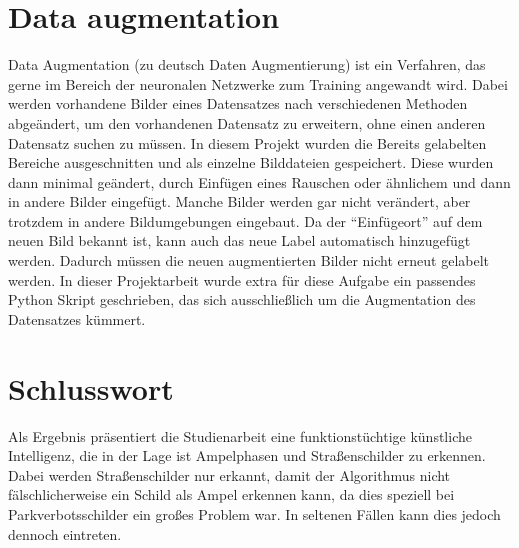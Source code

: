 \documentclass[a4paper,oneside,12pt]{report}
\begin{document}
	\chapter{Data augmentation}
	\begin{onehalfspace}
		Data Augmentation (zu deutsch Daten Augmentierung) ist ein Verfahren, das gerne im Bereich der neuronalen Netzwerke zum Training angewandt wird. Dabei werden vorhandene Bilder eines Datensatzes nach verschiedenen Methoden abgeändert, um den vorhandenen Datensatz zu erweitern, ohne einen anderen Datensatz suchen zu müssen. In diesem Projekt wurden die Bereits gelabelten Bereiche ausgeschnitten und als einzelne Bilddateien gespeichert. Diese wurden dann minimal geändert, durch Einfügen eines Rauschen oder ähnlichem und dann in andere Bilder eingefügt. Manche Bilder werden gar nicht verändert, aber trotzdem in andere Bildumgebungen eingebaut. Da der "`Einfügeort"' auf dem neuen Bild bekannt ist, kann auch das neue Label automatisch hinzugefügt werden. Dadurch müssen die neuen augmentierten Bilder nicht erneut gelabelt werden. In dieser Projektarbeit wurde extra für diese Aufgabe ein passendes Python Skript geschrieben, das sich ausschließlich um die Augmentation des Datensatzes kümmert.
	\end{onehalfspace}
	\chapter{Schlusswort}
	\begin{onehalfspace}
		Als Ergebnis präsentiert die Studienarbeit eine funktionstüchtige künstliche Intelligenz, die in der Lage ist Ampelphasen und Straßenschilder zu erkennen. Dabei werden Straßenschilder nur erkannt, damit der Algorithmus nicht fälschlicherweise ein Schild als Ampel erkennen kann, da dies speziell bei Parkverbotsschilder ein großes Problem war. In seltenen Fällen kann dies jedoch dennoch eintreten.
	\end{onehalfspace}
	
\end{document}
